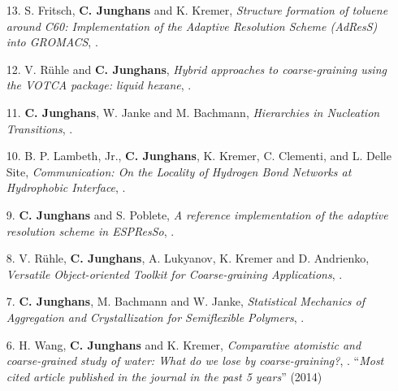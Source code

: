 \documentclass{article}
\begin{document}
\begin{enumerate}
\item[13.] S. Fritsch, \textbf{C. Junghans} and K. Kremer,
  \textit{Structure formation of toluene around C60: Implementation of the Adaptive Resolution Scheme (AdResS) into GROMACS},
  .

\item[12.] V. R{\"u}hle and \textbf{C. Junghans},
  \textit{Hybrid approaches to coarse-graining using the VOTCA package: liquid hexane},
  .

\item[11.] \textbf{C. Junghans}, W. Janke and M. Bachmann,
  \textit{Hierarchies in Nucleation Transitions},
  .

\item[10.] B. P. Lambeth, Jr., \textbf{C. Junghans}, K. Kremer, C. Clementi, and L. Delle Site, 
  \textit{Communication: On the Locality of Hydrogen Bond Networks at Hydrophobic Interface},
  .

\item[9.] \textbf{C. Junghans} and S. Poblete,
  \textit{A reference implementation of the adaptive resolution scheme in ESPResSo},
  .

\item[8.] V. R{\"u}hle, \textbf{C. Junghans}, A. Lukyanov, K. Kremer and D. Andrienko,
  \textit{Versatile Object-oriented Toolkit for Coarse-graining Applications},
  . 

\item[7.] \textbf{C. Junghans}, M. Bachmann and W. Janke,
  \textit{Statistical Mechanics of Aggregation and Crystallization for Semiflexible Polymers},
  .

\item[6.] H. Wang, \textbf{C. Junghans} and K. Kremer,
  \textit{Comparative atomistic and coarse-grained study of water: What do we lose by coarse-graining?},
  . 
  ``\emph{Most cited article published in the journal in the past 5 years}'' (2014)


\end{enumerate}
\end{document}
